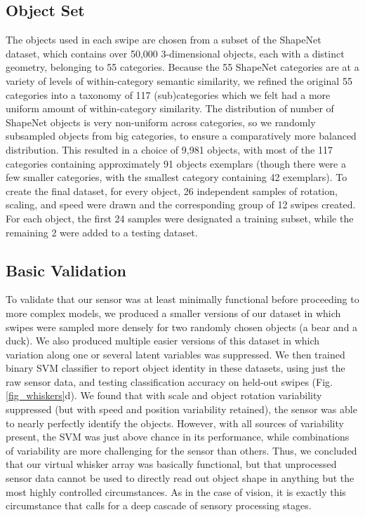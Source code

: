 \subsection{Object Set}
The objects used in each swipe are chosen from a subset of the ShapeNet~\cite{Chang2015} dataset, which contains over 50,000 3-dimensional objects, each with a distinct geometry, belonging to 55 categories.
Because the 55 ShapeNet categories are at a variety of levels of within-category semantic similarity, we refined the original 55 categories into a taxonomy of 117 (sub)categories which we felt had a more uniform amount of within-category similarity. 
The distribution of number of ShapeNet objects is very non-uniform across categories, so we randomly subsampled objects from big categories, to ensure a comparatively more balanced distribution.  
This resulted in a choice of 9,981 objects, with most of the 117 categories containing approximately 91 objects exemplars (though there were a few smaller categories, with the smallest category containing 42 exemplars).
To create the final dataset, for every object, 26 independent samples of rotation, scaling, and speed were drawn and the corresponding group of 12 swipes created.   
For each object, the first 24 samples were designated a training subset, while the remaining 2 were added to a testing dataset. 


\subsection{Basic Validation}
To validate that our sensor was at least minimally functional before proceeding to more complex models, we produced a smaller versions of our dataset in which swipes were sampled more densely for two randomly chosen objects (a bear and a duck).  
We also produced multiple easier versions of this dataset in which variation along one or several latent variables was suppressed. 
We then trained binary SVM classifier to report object identity in these datasets, using just the raw sensor data, and testing classification accuracy on held-out swipes (Fig. \ref{fig_whiskers}d).  We found that with scale and object rotation variability suppressed (but with speed and position variability retained), the sensor was able to nearly perfectly identify the objects.  
However, with all sources of variability present, the SVM was just above chance in its performance,  
while combinations of variability are more challenging for the sensor than others. 
Thus, we concluded that our virtual whisker array was basically functional, but that unprocessed sensor data cannot be used to directly read out object shape in anything but the most highly controlled circumstances.
As in the case of vision, it is exactly this circumstance that calls for a deep cascade of sensory processing stages. 

